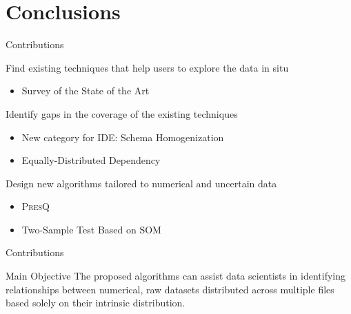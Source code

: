 \documentclass[10pt]{beamer}
\newcommand{\PresQ}[0]{\textsc{PresQ}\xspace}
\begin{document}
\section{Conclusions}

\begin{frame}{Contributions}

\begin{alertblock}{ Find existing techniques that help users to explore the data in situ}
    \begin{itemize}
        \item Survey of the State of the Art
    \end{itemize}
\end{alertblock}

\begin{alertblock}{ Identify gaps in the coverage of the existing techniques}
    \begin{itemize}
        \item New category for IDE: \alert{Schema Homogenization}
        \item Equally-Distributed Dependency
    \end{itemize}
\end{alertblock}

\begin{alertblock}{ Design new algorithms tailored to numerical and uncertain data}
    \begin{itemize}
        \item \PresQ
        \item Two-Sample Test Based on SOM
    \end{itemize}
\end{alertblock}

\end{frame}

\begin{frame}{Contributions}

\begin{block}{ Main Objective}
    The proposed algorithms can assist data scientists in identifying relationships
    between numerical, raw datasets distributed across multiple files
    based solely on their intrinsic distribution.
\end{block}

\end{frame}
\end{document}
